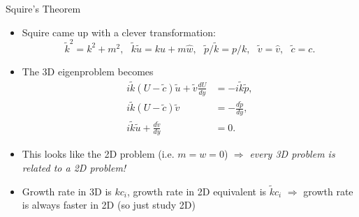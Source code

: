 \documentclass[landscape]{seminar}
\begin{document}
\begin{slide}

\begin{center}Squire's Theorem\end{center}

\begin{itemize}
  \item Squire came up with a clever transformation:
\begin{equation*}
\tilde{k}^2 = k^2 + m^2, \ \ \ \tilde{k} \tilde{u} = k \hat{u} + m \hat{w}, \ \ \ \tilde{p} / \tilde{k} = p / k, \ \ \ \tilde{v} = \hat{v}, \ \ \ \tilde{c} = c.
\end{equation*}

\item The 3D eigenproblem becomes
\begin{subequations}
\begin{align}
i \tilde{k} (U - \tilde{c}) \tilde{u} + \tilde{v} \frac{dU}{dy} &= - i \tilde{k} \tilde{p}, \\
i \tilde{k} (U - \tilde{c}) \tilde{v} &= - \frac{d\tilde{p}}{dy}, \\
i \tilde{k} \tilde{u} + \frac{d \tilde{v}}{d y} &= 0.
\end{align}
\end{subequations}

 \item This looks like the 2D problem (i.e. $m = w = 0$) $\Rightarrow$ \emph{every 3D problem is related to a 2D problem!}

 \item Growth rate in 3D is $k c_i$, growth rate in 2D equivalent is $\tilde{k} c_i$ $\Rightarrow$ growth rate is always faster in 2D (so just study 2D)

\end{itemize}

\end{slide}
\end{document}
